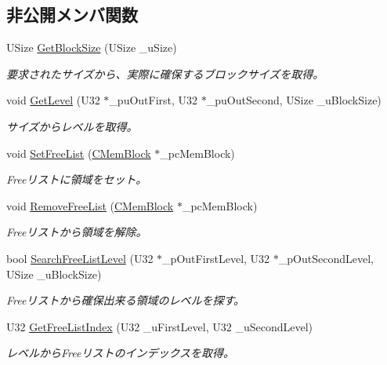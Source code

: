 \subsection*{非公開メンバ関数}
\begin{DoxyCompactItemize}
\item 
U\+Size \hyperlink{class_c_mem_allocator_a920fe29d9b0bdaa721eaa20c66abaa2e}{Get\+Block\+Size} (U\+Size \+\_\+u\+Size)
\begin{DoxyCompactList}\small\item\em 要求されたサイズから、実際に確保するブロックサイズを取得。 \end{DoxyCompactList}\item 
void \hyperlink{class_c_mem_allocator_af607e6b68b3b614e769b6e93078a04ca}{Get\+Level} (U32 $\ast$\+\_\+pu\+Out\+First, U32 $\ast$\+\_\+pu\+Out\+Second, U\+Size \+\_\+u\+Block\+Size)
\begin{DoxyCompactList}\small\item\em サイズからレベルを取得。 \end{DoxyCompactList}\item 
void \hyperlink{class_c_mem_allocator_a7a916e62db377590430d6969551cc547}{Set\+Free\+List} (\hyperlink{class_c_mem_block}{C\+Mem\+Block} $\ast$\+\_\+pc\+Mem\+Block)
\begin{DoxyCompactList}\small\item\em Freeリストに領域をセット。 \end{DoxyCompactList}\item 
void \hyperlink{class_c_mem_allocator_a54bea8680421134c27912868508792aa}{Remove\+Free\+List} (\hyperlink{class_c_mem_block}{C\+Mem\+Block} $\ast$\+\_\+pc\+Mem\+Block)
\begin{DoxyCompactList}\small\item\em Freeリストから領域を解除。 \end{DoxyCompactList}\item 
bool \hyperlink{class_c_mem_allocator_a5157e10cc3b426b42f661a6f3c0d8f51}{Search\+Free\+List\+Level} (U32 $\ast$\+\_\+p\+Out\+First\+Level, U32 $\ast$\+\_\+p\+Out\+Second\+Level, U\+Size \+\_\+u\+Block\+Size)
\begin{DoxyCompactList}\small\item\em Freeリストから確保出来る領域のレベルを探す。 \end{DoxyCompactList}\item 
U32 \hyperlink{class_c_mem_allocator_a9f0303603e63a742cc97c82d64fe90d5}{Get\+Free\+List\+Index} (U32 \+\_\+u\+First\+Level, U32 \+\_\+u\+Second\+Level)
\begin{DoxyCompactList}\small\item\em レベルから\+Freeリストのインデックスを取得。 \end{DoxyCompactList}\end{DoxyCompactItemize}
